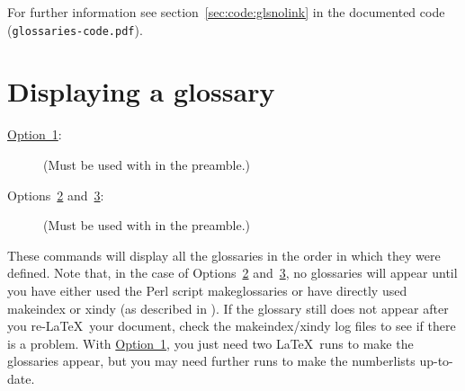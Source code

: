 \documentclass[report,inlinetitle]{nlctdoc}
\newcommand*{\opt}[1]{\hyperlink{option#1}{Option~#1}}
\newcommand*{\optsand}[2]{Options~\hyperlink{option#1}{#1}
and~\hyperlink{option#2}{#2}}
\begin{document}
For further information see \ifpdf section~\ref*{sec:code:glsnolink}
\fi {} in the documented code (\texttt{glossaries-code.pdf}).

\chapter{Displaying a glossary}
\label{sec:printglossary}

\begin{description}
\item[\opt1:]\null
\begin{definition}[\DescribeMacro{\printnoidxglossaries}]
\end{definition}
(Must be used with  in the preamble.)

\item[\optsand23:]\null
\begin{definition}[\DescribeMacro{\printglossaries}]
\end{definition}
(Must be used with  in the preamble.)
\end{description}

These commands will display all the glossaries in the order in which they were
defined. Note that, in the case of \optsand23, no glossaries will appear until you have either
used the Perl script \gls{makeglossaries} or have directly used
\gls{makeindex} or \gls{xindy} (as described in
). If the glossary 
still does not appear after you re-\LaTeX\ your document, check the
\gls*{makeindex}\slash\gls*{xindy} log files to see if there is a problem.
With \opt1, you just need two \LaTeX\ runs to make the glossaries appear, 
but you may need further runs to make the \glspl{numberlist} up-to-date.
\end{document}
